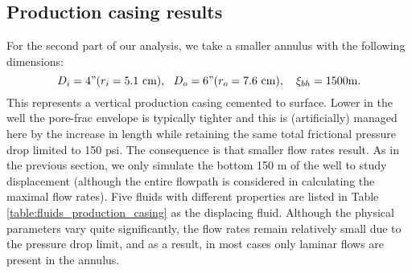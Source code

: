 \documentclass[review]{elsarticle}
\begin{document}
\subsection{Production casing results}
\label{sec:production}

For the second part of our analysis, we take a smaller annulus with the following dimensions:
\[
	  D_{i} = 4" ( r_i = 5.1 \text{ cm}), ~~ D_{o} = 6" ( r_o = 7.6 \text{ cm}),~~~  \xi_{bh} = 1500\text{m}.
\]
This represents a vertical production casing cemented to surface. Lower in the well the pore-frac envelope is typically tighter and this is (artificially) managed here by the increase in length while retaining the same total frictional pressure drop limited to 150 psi. The consequence is that smaller flow rates result. As in the previous section, we only simulate the bottom 150 m of the well to study displacement (although the entire flowpath is considered in calculating the maximal flow rates).
Five fluids with different properties are listed in Table \ref{table:fluids_production_casing} as the displacing fluid. Although the physical parameters vary quite significantly, the flow rates remain relatively small due to the pressure drop limit, and as a result, in most cases only laminar flows are present in the annulus.
\end{document}
